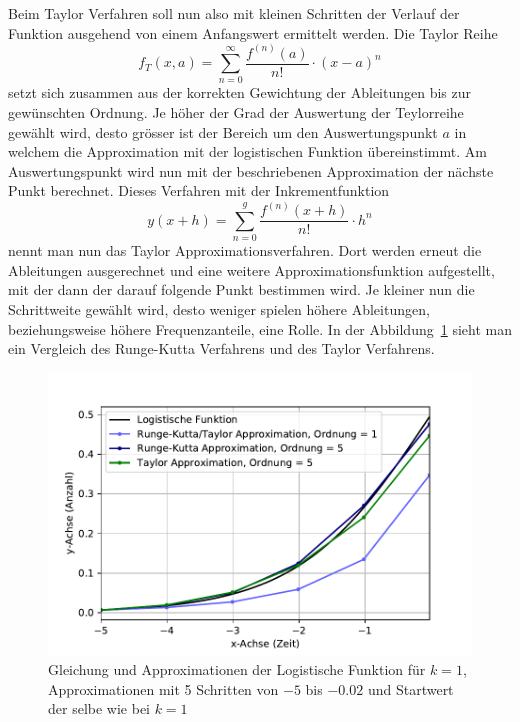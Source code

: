 Beim Taylor Verfahren soll nun also mit kleinen Schritten der Verlauf der Funktion ausgehend von einem Anfangswert ermittelt werden.
Die Taylor Reihe
\begin{equation}
f_{T}(x,a)
=
\sum_{n=0}^{\infty}{\frac{f^{(n)}(a)}{n!}}\cdot (x-a)^{n}
\label{taylor:section:taylor}
\end{equation}
setzt sich zusammen aus der korrekten Gewichtung der Ableitungen bis zur gewünschten Ordnung.
Je höher der Grad der Auswertung der Teylorreihe gewählt wird, desto grösser ist der Bereich um den Auswertungspunkt $a$ in welchem die Approximation mit der logistischen Funktion übereinstimmt.
Am Auswertungspunkt wird nun mit der beschriebenen Approximation der nächste Punkt berechnet.
Dieses Verfahren mit der Inkrementfunktion
\begin{equation}
y(x+h)
=
\sum_{n=0}^{g}{\frac{f^{(n)}(x+h)}{n!}}\cdot h^{n}
\label{taylor:section:taylorapproximation}
\end{equation}
nennt man nun das Taylor Approximationsverfahren.
Dort werden erneut die Ableitungen ausgerechnet und eine weitere Approximationsfunktion aufgestellt, mit der dann der darauf folgende Punkt bestimmen wird.
Je kleiner nun die Schrittweite gewählt wird, desto weniger spielen höhere Ableitungen, beziehungsweise höhere Frequenzanteile, eine Rolle.
In der Abbildung~\ref{taylor:section:fig:LogisticFunctionApproximation} sieht man ein Vergleich des Runge-Kutta Verfahrens und des Taylor Verfahrens.

\begin{figure}
	\begin{center}
	\includegraphics[width=12cm]{papers/taylor/taylorPictures/LogisticFunction.pdf}
	\caption{Gleichung und Approximationen der Logistische Funktion für $k=1$, Approximationen mit 5 Schritten von $-5$ bis $-0.02$ und Startwert der selbe wie bei $k=1$}
	\label{taylor:section:fig:LogisticFunctionApproximation}
	\end{center}
\end{figure}

